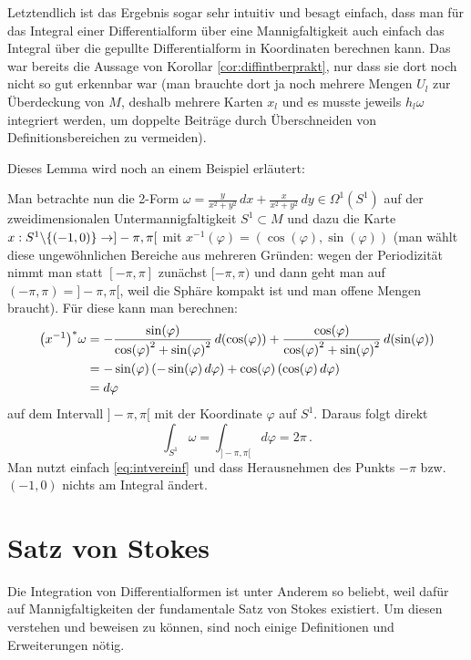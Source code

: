 \documentclass[../H_Analysis_main.tex]{subfiles}
\begin{document}
Letztendlich ist das Ergebnis sogar sehr intuitiv und besagt einfach, dass man für das Integral einer Differentialform über eine Mannigfaltigkeit auch einfach das Integral über die gepullte Differentialform in Koordinaten berechnen kann. Das war bereits die Aussage von Korollar \ref{cor:diffintberprakt}, nur dass sie dort noch nicht so gut erkennbar war (man brauchte dort ja noch mehrere Mengen $U_l$ zur Überdeckung von $M$, deshalb mehrere Karten $x_l$ und es musste jeweils $h_l \omega$ integriert werden, um doppelte Beiträge durch Überschneiden von Definitionsbereichen zu vermeiden).

Dieses Lemma wird noch an einem Beispiel erläutert:
\begin{bsp}
Man betrachte nun die 2-Form $\omega = \frac{y}{x^2 + y^2} \, dx + \frac{x}{x^2 + y^2} \, dy \in \Omega^1(S^1)$ auf der zweidimensionalen Untermannigfaltigkeit $S^1 \subset M$ und dazu die Karte $x: S^1 \backslash\qty{(-1, 0)} \rightarrow ]-\pi, \pi[$ mit $x^{-1}(\varphi) = (\cos(\varphi), \sin(\varphi))$ (man wählt diese ungewöhnlichen Bereiche aus mehreren Gründen: wegen der Periodizität nimmt man statt $[-\pi, \pi]$ zunächst $[-\pi, \pi)$ und dann geht man auf $(-\pi, \pi) = ]-\pi, \pi[$, weil die Sphäre kompakt ist und man offene Mengen braucht). Für diese kann man berechnen:
\begin{align}
\qty(x^{-1})^* \omega &= -\frac{\sin(\varphi)}{\cos(\varphi)^2 + \sin(\varphi)^2} \, d(\cos(\varphi)) + \frac{\cos(\varphi)}{\cos(\varphi)^2 + \sin(\varphi)^2} \, d(\sin(\varphi)) 
\notag\\
&= - \sin(\varphi) \, \qty(- \sin(\varphi) \, d\varphi) + \cos(\varphi) \, \qty(\cos(\varphi) \, d\varphi)
\notag\\
&= d\varphi
\end{align}
auf dem Intervall $]-\pi, \pi[$ mit der Koordinate $\varphi$ auf $S^1$. Daraus folgt direkt
\begin{equation}
\int_{S^1} \omega = \int_{]-\pi, \pi[} d\varphi = 2\pi \, .
\end{equation}
Man nutzt einfach \eqref{eq:intvereinf} und dass Herausnehmen des Punkts $-\pi$ bzw.~$(-1, 0)$ nichts am Integral ändert.%
\end{bsp}


\newpage


	\section{Satz von Stokes}
Die Integration von Differentialformen ist unter Anderem so beliebt, weil dafür auf Mannigfaltigkeiten der fundamentale Satz von Stokes existiert. Um diesen verstehen und beweisen zu können, sind noch einige Definitionen und Erweiterungen nötig.
\end{document}
